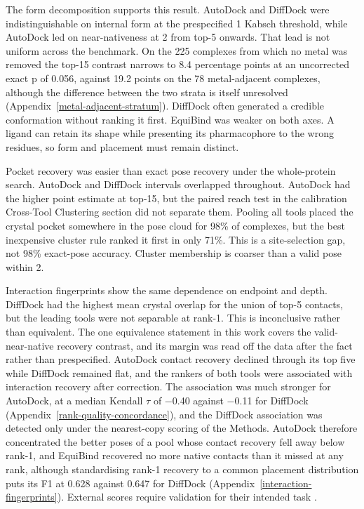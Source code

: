 The form decomposition supports this result. AutoDock and DiffDock were indistinguishable on internal form at the prespecified 1\angstrom{} Kabsch threshold, while AutoDock led on near-nativeness at 2\angstrom{} from top-5 onwards. That lead is not uniform across the benchmark. On the 225 complexes from which no metal was removed the top-15 contrast narrows to 8.4 percentage points at an uncorrected exact p of 0.056, against 19.2 points on the 78 metal-adjacent complexes, although the difference between the two strata is itself unresolved (Appendix~\ref{metal-adjacent-stratum}). DiffDock often generated a credible conformation without ranking it first. EquiBind was weaker on both axes. A ligand can retain its shape while presenting its pharmacophore to the wrong residues, so form and placement must remain distinct.

Pocket recovery was easier than exact pose recovery under the whole-protein search. AutoDock and DiffDock intervals overlapped throughout. AutoDock had the higher point estimate at top-15, but the paired reach test in the calibration Cross-Tool Clustering section did not separate them. Pooling all tools placed the crystal pocket somewhere in the pose cloud for 98\% of complexes, but the best inexpensive cluster rule ranked it first in only 71\%. This is a site-selection gap, not 98\% exact-pose accuracy. Cluster membership is coarser than a valid pose within 2\angstrom{}.

Interaction fingerprints show the same dependence on endpoint and depth. DiffDock had the highest mean crystal overlap for the union of top-5 contacts, but the leading tools were not separable at rank-1. This is inconclusive rather than equivalent. The one equivalence statement in this work covers the valid-near-native recovery contrast, and its margin was read off the data after the fact rather than prespecified. AutoDock contact recovery declined through its top five while DiffDock remained flat, and the rankers of both tools were associated with interaction recovery after correction. The association was much stronger for AutoDock, at a median Kendall \ensuremath{\tau} of \ensuremath{-}0.40 against \ensuremath{-}0.11 for DiffDock (Appendix~\ref{rank-quality-concordance}), and the DiffDock association was detected only under the nearest-copy scoring of the Methods. AutoDock therefore concentrated the better poses of a pool whose contact recovery fell away below rank-1, and EquiBind recovered no more native contacts than it missed at any rank, although standardising rank-1 recovery to a common placement distribution puts its F1 at 0.628 against 0.647 for DiffDock (Appendix~\ref{interaction-fingerprints}). External scores require validation for their intended task \cite{ref067}.

